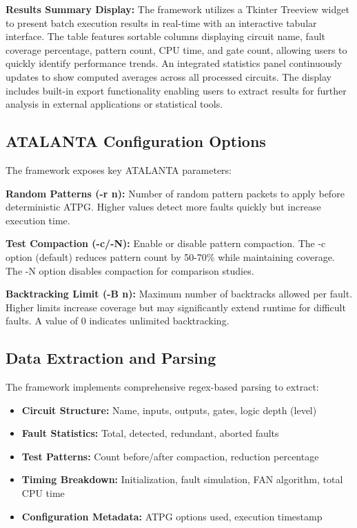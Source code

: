 \documentclass[conference]{IEEEtran}
\begin{document}
\textbf{Results Summary Display:} The framework utilizes a Tkinter Treeview widget to present batch execution results in real-time with an interactive tabular interface. The table features sortable columns displaying circuit name, fault coverage percentage, pattern count, CPU time, and gate count, allowing users to quickly identify performance trends. An integrated statistics panel continuously updates to show computed averages across all processed circuits. The display includes built-in export functionality enabling users to extract results for further analysis in external applications or statistical tools.

\subsection{ATALANTA Configuration Options}

The framework exposes key ATALANTA parameters:

\textbf{Random Patterns (-r n):} Number of random pattern packets to apply before deterministic ATPG. Higher values detect more faults quickly but increase execution time.

\textbf{Test Compaction (-c/-N):} Enable or disable pattern compaction. The -c option (default) reduces pattern count by 50-70\% while maintaining coverage. The -N option disables compaction for comparison studies.

\textbf{Backtracking Limit (-B n):} Maximum number of backtracks allowed per fault. Higher limits increase coverage but may significantly extend runtime for difficult faults. A value of 0 indicates unlimited backtracking.

\subsection{Data Extraction and Parsing}

The framework implements comprehensive regex-based parsing to extract:
\begin{itemize}
\item \textbf{Circuit Structure:} Name, inputs, outputs, gates, logic depth (level)
\item \textbf{Fault Statistics:} Total, detected, redundant, aborted faults
\item \textbf{Test Patterns:} Count before/after compaction, reduction percentage
\item \textbf{Timing Breakdown:} Initialization, fault simulation, FAN algorithm, total CPU time
\item \textbf{Configuration Metadata:} ATPG options used, execution timestamp
\end{itemize}
\end{document}
